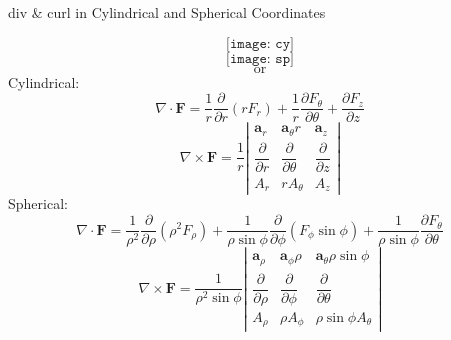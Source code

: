 \documentclass[10pt]{beamer}
\begin{document}
\begin{frame}[allowframebreaks]{div \& curl in Cylindrical and Spherical Coordinates}

$$\texttt{[image: cy]}$$
$$\texttt{[image: sp]}$$	
$$\text{or}$$
\newpage
Cylindrical:
$$\nabla\cdot\mathbf{F} = \dfrac{1}{r}\dfrac{\partial}{\partial r}\left(rF_r\right) + \dfrac{1}{r}\dfrac{\partial F_\theta}{\partial \theta} + \dfrac{\partial F_z}{\partial z}$$
\[ \nabla\times\mathbf{F} = \dfrac{1}{r}\left\vert
\begin{matrix}
\mathbf{a}_r & \mathbf{a}_\theta r & \mathbf{a}_z\\
\dfrac{\partial }{\partial r} & \dfrac{\partial }{\partial \theta} & \dfrac{\partial }{\partial z}\\
A_r & rA_\theta & A_z
\end{matrix}
\right\vert\]
Spherical:
$$\nabla\cdot\mathbf{F} = \dfrac{1}{\rho^2}\dfrac{\partial}{\partial \rho}\left(\rho^2F_\rho\right) + \dfrac{1}{\rho\sin\phi}\dfrac{\partial}{\partial \phi}\left(F_\phi\sin\phi\right) + \dfrac{1}{\rho\sin\phi}\dfrac{\partial F_\theta}{\partial \theta}$$
\[ \nabla\times\mathbf{F} = \dfrac{1}{\rho^2\sin\phi}\left\vert
\begin{matrix}
\mathbf{a}_\rho & \mathbf{a}_\phi \rho & \mathbf{a}_\theta\rho\sin\phi\\
\dfrac{\partial }{\partial \rho} & \dfrac{\partial }{\partial \phi} & \dfrac{\partial }{\partial \theta}\\
A_\rho & \rho A_\phi & \rho\sin\phi A_\theta
\end{matrix}
\right\vert\]
\end{frame}
\end{document}

